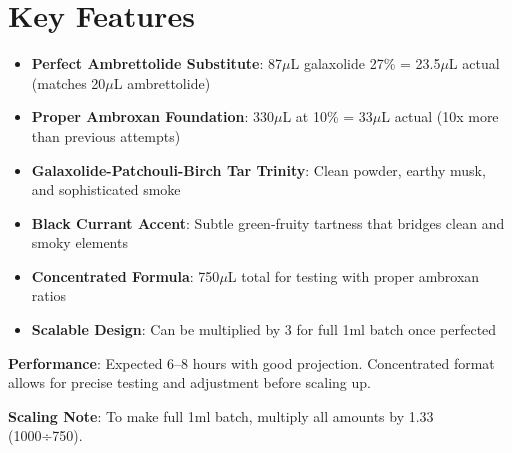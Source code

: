 \documentclass{article}
\begin{document}
\section{Key Features}

\begin{itemize}
    \item \textbf{Perfect Ambrettolide Substitute}: 87$\mu$L galaxolide 27\% = 23.5$\mu$L actual (matches 20$\mu$L ambrettolide)
    \item \textbf{Proper Ambroxan Foundation}: 330$\mu$L at 10\% = 33$\mu$L actual (10x more than previous attempts)
    \item \textbf{Galaxolide-Patchouli-Birch Tar Trinity}: Clean powder, earthy musk, and sophisticated smoke
    \item \textbf{Black Currant Accent}: Subtle green-fruity tartness that bridges clean and smoky elements
    \item \textbf{Concentrated Formula}: 750$\mu$L total for testing with proper ambroxan ratios
    \item \textbf{Scalable Design}: Can be multiplied by 3 for full 1ml batch once perfected
\end{itemize}

\textbf{Performance}: Expected 6--8 hours with good projection. Concentrated format allows for precise testing and adjustment before scaling up.

\textbf{Scaling Note}: To make full 1ml batch, multiply all amounts by 1.33 (1000÷750).
\end{document}
